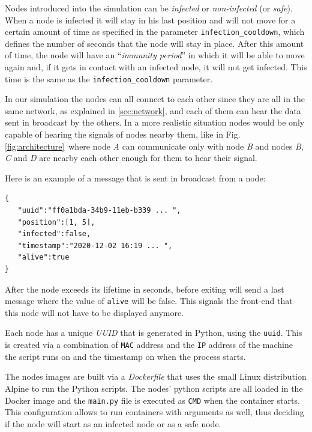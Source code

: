 \documentclass[conference]{IEEEtran}
\begin{document}
		Nodes introduced into the simulation can be \textit{infected} or \textit{non-infected} (or \textit{safe}).
		When a node is infected it will stay in his last position and will not move for a certain amount of time as specified in the parameter \texttt{infection\_cooldown}, which defines the number of seconds that the node will stay in place.
		After this amount of time, the node will have an ``\textit{immunity period}'' in which it will be able to move again and, if it gets in contact with an infected node, it will not get infected.
		This time is the same as the \texttt{infection\_cooldown} parameter.
		
		In our simulation the nodes can all connect to each other since they are all in the same network, as explained in \ref{sec:network}, and each of them can hear the data sent in broadcast by the others.
		In a more realistic situation nodes would be only capable of hearing the signals of nodes nearby them, like in Fig.\ref{fig:architecture}~where node \textit{A} can communicate only with node \textit{B} and nodes \textit{B}, \textit{C} and \textit{D} are nearby each other enough for them to hear their signal.

		Here is an example of a message that is sent in broadcast from a node:
		\begin{verbatim}
{  
   "uuid":"ff0a1bda-34b9-11eb-b339 ... ",
   "position":[1, 5],
   "infected":false,
   "timestamp":"2020-12-02 16:19 ... ",
   "alive":true
}  
		\end{verbatim}
		
		After the node exceeds its lifetime in seconds, before exiting will send a last message where the value of \texttt{alive} will be false.
		This signals the front-end that this node will not have to be displayed anymore.
		
		Each node has a unique \textit{UUID} that is generated in Python, using the \texttt{uuid}\cite{uuid}.
		This is created via a combination of \texttt{MAC} address and the \texttt{IP} address of the machine the script runs on and the timestamp on when the process starts.

		The nodes images are built via a \textit{Dockerfile} that uses the small Linux distribution Alpine to run the Python scripts.
		The nodes' python scripts are all loaded in the Docker image and the \texttt{main.py} file is executed as \texttt{CMD} when the container starts.
		This configuration allows to run containers with arguments as well, thus deciding if the node will start as an infected node or as a safe node.
	
\end{document}
